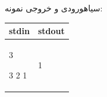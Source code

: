 

‌سیاه{ورودی و خروجی نمونه:}\\


\begin{latin}
	\begin{tabularx}{\textwidth}{|X | X|}
		\hline
		\textbf{stdin} &
		\textbf{stdout}\\
		\hline
		3
		
		3 2 1
		
		&
		1
		\\
		\hline
		
	\end{tabularx}
\end{latin}









